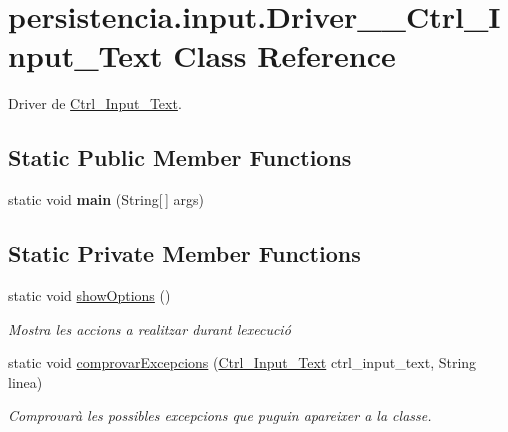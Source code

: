 \hypertarget{classpersistencia_1_1input_1_1Driver____Ctrl__Input__Text}{}\section{persistencia.\+input.\+Driver\+\_\+\+\_\+\+Ctrl\+\_\+\+Input\+\_\+\+Text Class Reference}
\label{classpersistencia_1_1input_1_1Driver____Ctrl__Input__Text}


Driver de \hyperlink{classpersistencia_1_1input_1_1Ctrl__Input__Text}{Ctrl\+\_\+\+Input\+\_\+\+Text}.  


\subsection*{Static Public Member Functions}
\begin{DoxyCompactItemize}
\item 
\mbox{\label{classpersistencia_1_1input_1_1Driver____Ctrl__Input__Text_a38cebd4cadb9198cb6a2c87147646ec0}} 
static void {\bfseries main} (String\mbox{[}$\,$\mbox{]} args)
\end{DoxyCompactItemize}
\subsection*{Static Private Member Functions}
\begin{DoxyCompactItemize}
\item 
\mbox{\label{classpersistencia_1_1input_1_1Driver____Ctrl__Input__Text_a51d02aa85468b0924d13e4060106459e}} 
static void \hyperlink{classpersistencia_1_1input_1_1Driver____Ctrl__Input__Text_a51d02aa85468b0924d13e4060106459e}{show\+Options} ()
\begin{DoxyCompactList}\small\item\em Mostra les accions a realitzar durant l\textquotesingle{}execució \end{DoxyCompactList}\item 
static void \hyperlink{classpersistencia_1_1input_1_1Driver____Ctrl__Input__Text_a3e4149adb11b97b330ce77f1c2b5ae9c}{comprovar\+Excepcions} (\hyperlink{classpersistencia_1_1input_1_1Ctrl__Input__Text}{Ctrl\+\_\+\+Input\+\_\+\+Text} ctrl\+\_\+input\+\_\+text, String linea)
\begin{DoxyCompactList}\small\item\em Comprovarà les possibles excepcions que puguin apareixer a la classe. \end{DoxyCompactList}\end{DoxyCompactItemize}


